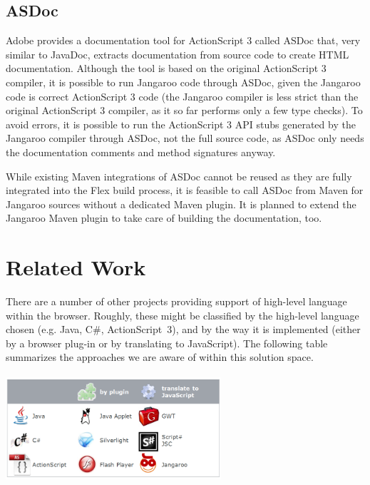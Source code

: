 \documentclass[11pt]{sigplanconf}
\begin{document}
\subsection{ASDoc}

Adobe provides a documentation tool for ActionScript 3 called ASDoc\citep{asdoc} that, very similar to JavaDoc, extracts documentation from source code to create HTML documentation. Although the tool is based on the original ActionScript 3 compiler, it is possible to run Jangaroo code through ASDoc, given the Jangaroo code is correct ActionScript 3 code (the Jangaroo compiler is less strict than the original ActionScript 3 compiler, as it so far performs only a few type checks). To avoid errors, it is possible to run the ActionScript 3 API stubs generated by the Jangaroo compiler through ASDoc, not the full source code, as ASDoc only needs the documentation comments and method signatures anyway.

While existing Maven integrations of ASDoc cannot be reused as they are fully integrated into the Flex build process, it is feasible to call ASDoc from Maven for Jangaroo sources without a dedicated Maven plugin. It is planned to extend the Jangaroo Maven plugin to take care of building the documentation, too.

\section{Related Work}

There are a number of other projects providing support of high-level language within the browser. Roughly, these might be classified by the high-level language chosen (e.g. Java, C\#, ActionScript\ 3), and by the way it is implemented (either by a browser plug-in or by translating to JavaScript). The following table summarizes the approaches we are aware of within this solution space.

\vspace{20pt}
\includegraphics[width=80mm,height=40mm]{TechnologyMatrix.png}
\vspace{20pt}
\end{document}
